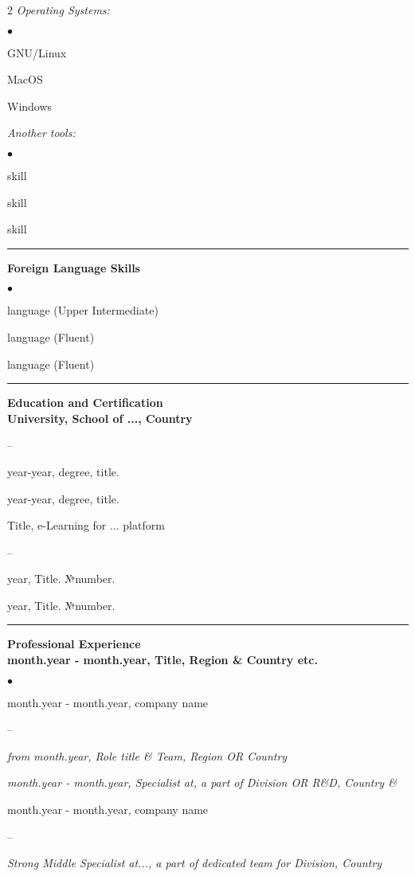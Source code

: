 \documentclass[oneside,final,12pt]{extreport}
\newenvironment{compactlist}{
	\begin{list}{{$\bullet$}}{
		\setlength\leftmargin{0.4cm}
		\setlength\partopsep{0pt}
		\setlength\parskip{0pt}
		\setlength\parsep{0pt}
		\setlength\topsep{0pt}
		\setlength\itemsep{0pt}
	}
}{
	\end{list}
}
\newenvironment{innerlist}{
	\begin{list}{--}{
		\setlength\leftmargin{0.8cm}
		\setlength\partopsep{0pt}
		\setlength\parskip{0pt}
		\setlength\parsep{0pt}
		\setlength\topsep{0pt}
		\setlength\itemsep{0pt}
	}
}{
	\end{list}
}
\begin{document}
\begin{multicols}{2}
\textsl{Operating Systems:}
	 \begin{compactlist}
		 \item GNU/Linux
		 \item MacOS
		 \item Windows
	 \end{compactlist}
\textsl{Another tools:}
	 \begin{compactlist}
		 \item skill
		 \item skill
		 \item skill
	 \end{compactlist}
\end{multicols}
\rule{\textwidth}{0.4pt}

\bfseries
Foreign Language Skills
\mdseries
\begin{compactlist}
	 \item language (Upper Intermediate)
	 \item language (Fluent)
	 \item language (Fluent) 
\end{compactlist}
\rule{\textwidth}{0.4pt}

\bfseries
Education and Certification
\mdseries \\[3pt]	
University, School of ..., Country  	
	 \begin{innerlist}	
	      \item year-year, degree, title. 
	      \item year-year, degree, title. 
	 \end{innerlist}	
Title, e-Learning for ... platform 
	 \begin{innerlist}	
	      \item year, Title. №number.
	      \item year, Title. №number.
	 \end{innerlist}	 
\rule{\textwidth}{0.4pt}

\bfseries
Professional Experience
\mdseries \\[1pt] 
month.year - month.year, Title, Region \& Country etc. 
     \begin{compactlist}
	      \item month.year - month.year, company name
	           \begin{innerlist} 
	                \item \textsl{from month.year, Role title \& Team, Region OR Country} 
	                \item \textsl{month.year - month.year, Specialist at, a part of Division OR R\&D, Country \& } 
                \end{innerlist} 
           \item  month.year - month.year, company name
                \begin{innerlist} 	
                     \item \textsl{Strong Middle Specialist at..., a part  of dedicated team for Division, Country} 
                \end{innerlist} 
      \end{compactlist}
\end{document}
